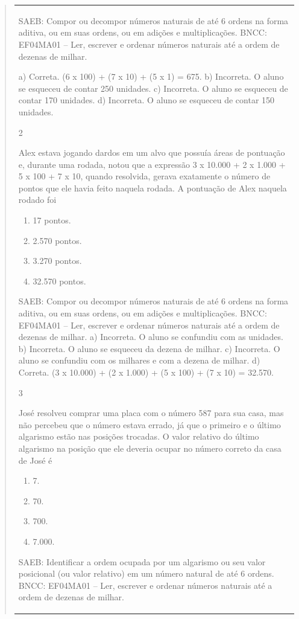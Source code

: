 \begin{mdframed}[linewidth=2pt,linecolor=salmao,roundcorner=2pt]
\begin{itemize}
{\begin{itemize}
\begin{escolha}
{\begin{quote}
{\begin{escolha}
{{{{{\begin{longtable}[]{@{}l@{}}
\begin{itemize}
{SAEB: Compor ou decompor números naturais de até 6 ordens na forma aditiva, ou
em suas ordens, ou em adições e multiplicações.
BNCC: EF04MA01 -- Ler, escrever e ordenar números naturais até a ordem de dezenas de milhar.

a) Correta. (6 x 100) + (7 x 10) + (5 x 1) = 675.
b) Incorreta. O aluno se esqueceu de contar 250 unidades.
c) Incorreta. O aluno se esqueceu de contar 170 unidades.
d) Incorreta. O aluno se esqueceu de contar 150 unidades.

\num{2}

Alex estava jogando dardos em um alvo que possuía áreas de pontuação e,
durante uma rodada, notou que a expressão 3 x 10.000 + 2 x 1.000 + 5 x
100 + 7 x 10, quando resolvida, gerava exatamente o número de pontos que
ele havia feito naquela rodada. A pontuação de Alex naquela rodado foi

\begin{enumerate}
\item
  17 pontos.
\item
  2.570 pontos.
\item
  3.270 pontos.
\item
  32.570 pontos.
\end{enumerate}

SAEB: Compor ou decompor números naturais de até 6 ordens na forma aditiva, ou
em suas ordens, ou em adições e multiplicações.
BNCC: EF04MA01 -- Ler, escrever e ordenar números naturais até a ordem de dezenas de milhar.
a) Incorreta. O aluno se confundiu com as unidades.
b) Incorreta. O aluno se esqueceu da dezena de milhar.
c) Incorreta. O aluno se confundiu com os milhares e com a dezena de milhar.
d) Correta. (3 x 10.000) + (2 x 1.000) + (5 x 100) + (7 x 10) = 32.570.

\num{3}

José resolveu comprar uma placa com o número 587 para sua casa, mas
não percebeu que o número estava
errado, já que o primeiro e o último algarismo estão nas posições
trocadas. O valor relativo do último algarismo na posição que ele deveria ocupar no número correto da casa de José é

\begin{enumerate}
\item
  7.
\item
  70.
\item
  700.
\item
  7.000.
\end{enumerate}

SAEB: Identificar a ordem ocupada por um algarismo ou seu valor posicional (ou
valor relativo) em um número natural de até 6 ordens.
BNCC: EF04MA01 -- Ler, escrever e ordenar números naturais até a ordem de dezenas de milhar.

}
\end{itemize}
\end{longtable}}}}}}
\end{escolha}}
\end{quote}}
\end{escolha}
\end{itemize}}
\end{itemize}
\end{mdframed}
